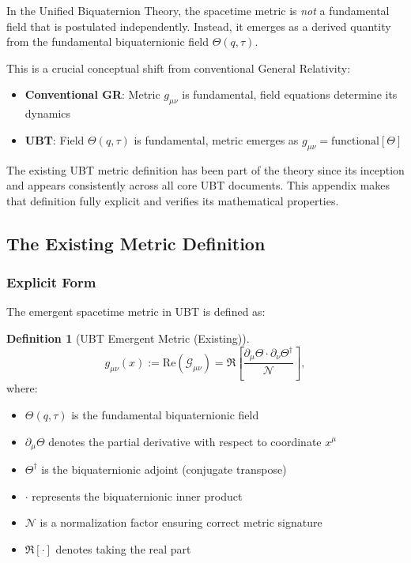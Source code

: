 \documentclass[12pt]{article}
\theoremstyle{definition}
\newtheorem{definition}[theorem]{Definition}
\theoremstyle{remark}
\begin{document}
In the Unified Biquaternion Theory, the spacetime metric is \textit{not} a fundamental field that is postulated independently. Instead, it emerges as a derived quantity from the fundamental biquaternionic field $\Theta(q,\tau)$.

This is a crucial conceptual shift from conventional General Relativity:
\begin{itemize}
    \item \textbf{Conventional GR}: Metric $g_{\mu\nu}$ is fundamental, field equations determine its dynamics
    \item \textbf{UBT}: Field $\Theta(q,\tau)$ is fundamental, metric emerges as $g_{\mu\nu} = \text{functional}[\Theta]$
\end{itemize}

The existing UBT metric definition has been part of the theory since its inception and appears consistently across all core UBT documents. This appendix makes that definition fully explicit and verifies its mathematical properties.

\subsection{The Existing Metric Definition}

\subsubsection{Explicit Form}

The emergent spacetime metric in UBT is defined as:

\begin{definition}[UBT Emergent Metric (Existing)]
\begin{equation}
g_{\mu\nu}(x) := \text{Re}\left(\mathcal{G}_{\mu\nu}\right) = \Re\left[ \frac{\partial_\mu \Theta \cdot \partial_\nu \Theta^\dagger}{\mathcal{N}} \right],
\label{eq:ubt_metric_existing}
\end{equation}
where:
\begin{itemize}
    \item $\Theta(q,\tau)$ is the fundamental biquaternionic field
    \item $\partial_\mu \Theta$ denotes the partial derivative with respect to coordinate $x^\mu$
    \item $\Theta^\dagger$ is the biquaternionic adjoint (conjugate transpose)
    \item $\cdot$ represents the biquaternionic inner product
    \item $\mathcal{N}$ is a normalization factor ensuring correct metric signature
    \item $\Re[\cdot]$ denotes taking the real part
\end{itemize}
\end{definition}
\end{document}
